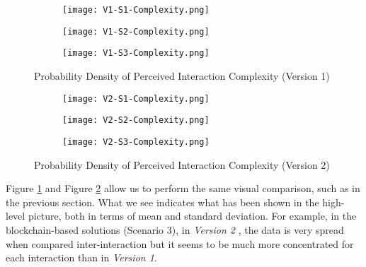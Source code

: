 \begin{figure}[htb]
    \centering
    \begin{subfigure}[b]{0.49\textwidth}
        \centering
        \texttt{[image: V1-S1-Complexity.png]}
    \end{subfigure}
    \begin{subfigure}[b]{0.49\textwidth}
        \centering
        \texttt{[image: V1-S2-Complexity.png]}
    \end{subfigure}
    \hfill
    \begin{subfigure}[b]{0.49\textwidth}
        \centering
        \texttt{[image: V1-S3-Complexity.png]}
    \end{subfigure}
    
    \caption{Probability Density of Perceived Interaction Complexity (Version 1)}
    \label{fig: perceivedInteractionComplexityOne}    
\end{figure}

\begin{figure}[htb]
    \centering
    \begin{subfigure}[b]{0.49\textwidth}
        \centering
        \texttt{[image: V2-S1-Complexity.png]}
    \end{subfigure}
    \begin{subfigure}[b]{0.49\textwidth}
        \centering
        \texttt{[image: V2-S2-Complexity.png]}
    \end{subfigure}
    \hfill
    \begin{subfigure}[b]{0.49\textwidth}
        \centering
        \texttt{[image: V2-S3-Complexity.png]}
    \end{subfigure}
    
    \caption{Probability Density of Perceived Interaction Complexity (Version 2)}
    \label{fig: perceivedInteractionComplexityTwo}   
\end{figure}

Figure \ref{fig: perceivedInteractionComplexityOne} and Figure \ref{fig: perceivedInteractionComplexityTwo} allow us to perform the same visual comparison, such as in the previous section. What we see indicates what has been shown in the high-level picture, both in terms of mean and standard deviation. For example, in the blockchain-based solutions (Scenario 3), in \textit{Version 2} , the data is very spread when compared inter-interaction but it seems to be much more concentrated for each interaction than in \textit{Version 1}.
  
